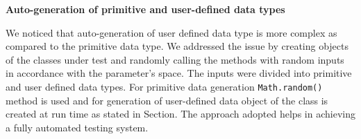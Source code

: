 \textbf{Auto-generation of primitive and user-defined data types}

We noticed that auto-generation of user defined data type is more complex as compared to the primitive data type. We addressed the issue by creating objects of the classes under test and randomly calling the methods with random inputs in accordance with the parameter's space. The inputs were divided into primitive and user defined data types.  For primitive data generation \verb+Math.random()+ method is used and for generation of user-defined data object of the class is created at run time as stated in Section{}. The approach adopted helps in achieving a fully automated testing system.













